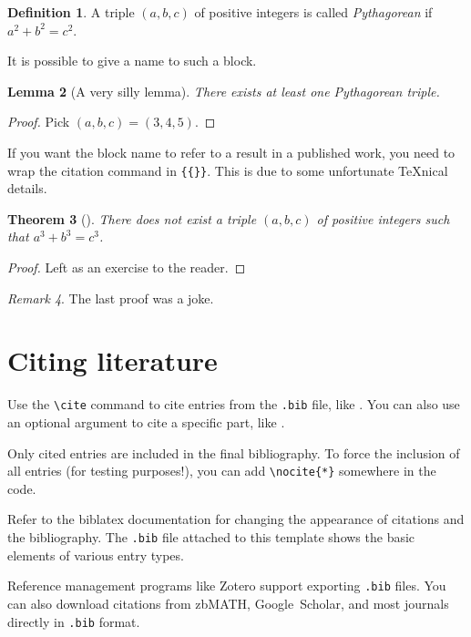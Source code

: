 \documentclass[a4paper, 11pt]{report}
\theoremstyle{plain}
\newtheorem{theorem}{Theorem}[section] %
\newtheorem{lemma}[theorem]{Lemma} %
\theoremstyle{definition}
\newtheorem{definition}[theorem]{Definition}
\theoremstyle{remark}
\newtheorem{remark}[theorem]{Remark}
\begin{document}
\begin{definition}
A triple $(a, b, c)$ of positive integers is called \emph{Pythagorean} if $a^2 + b^2 = c^2$.
\end{definition}

It is possible to give a name to such a block.

\begin{lemma}[A very silly lemma]
There exists at least one Pythagorean triple.
\end{lemma}
\begin{proof}
Pick $(a, b, c) = (3, 4, 5)$.
\end{proof}

If you want the block name to refer to a result in a published work,
you need to wrap the citation command in \verb|{{}}|.
This is due to some unfortunate \TeX nical details.

\begin{theorem}[{{\cite[Theorem~0.5]{wiles}}}]
There does not exist a triple $(a, b, c)$ of positive integers such that $a^3 + b^3 = c^3$.
\end{theorem}
\begin{proof}
Left as an exercise to the reader.
\end{proof}

\begin{remark}
The last proof was a joke.
\end{remark}



\section{Citing literature}

Use the \verb|\cite| command to cite entries from the \verb|.bib| file,
like \cite{analyysia}.
You can also use an optional argument to cite a specific part, like \cite[p.~20]{analyysia}.

Only cited entries are included in the final bibliography.
To force the inclusion of all entries (for testing purposes!),
you can add \verb|\nocite{*}| somewhere in the code.
\nocite{*}

Refer to the biblatex documentation \cite{biblatex}
for changing the appearance of citations and the bibliography.
The \verb|.bib| file attached to this template shows the basic elements
of various entry types.

Reference management programs like Zotero support exporting \verb|.bib| files.
You can also download citations from \mbox{zbMATH}, Google~Scholar, and most journals
directly in \verb|.bib| format.
\end{document}
